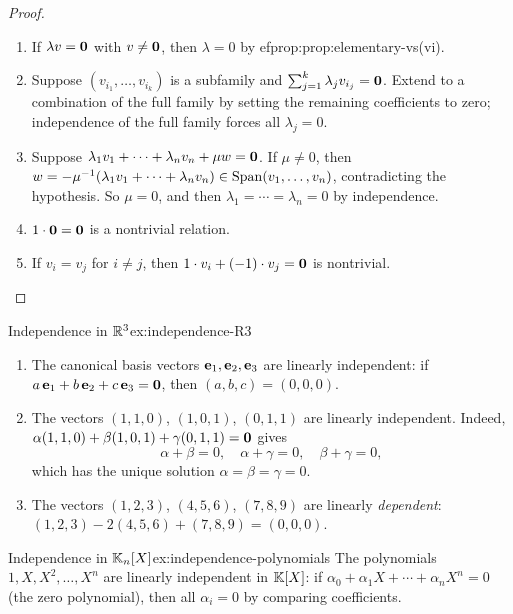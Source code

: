 \begin{proof}
\begin{enumerate}[label=(\roman*)]
  \item If $\lambda v = \mathbf{0}$ with $v\neq\mathbf{0}$, then $\lambda = 0$
    by 
ef{prop:prop:elementary-vs}(vi).

  \item Suppose $(v_{i_1},\ldots,v_{i_k})$ is a subfamily and
    $\sum_{j=1}^k \lambda_j v_{i_j} = \mathbf{0}$. Extend to a combination
    of the full family by setting the remaining coefficients to zero;
    independence of the full family forces all $\lambda_j = 0$.

  \item Suppose $\lambda_1 v_1+\cdots+\lambda_n v_n + \mu w = \mathbf{0}$.
    If $\mu\neq 0$, then
    $w = -\mu^{-1}(\lambda_1 v_1+\cdots+\lambda_n v_n)\in
    \operatorname{Span}(v_1,\ldots,v_n)$, contradicting the hypothesis. So $\mu=0$,
    and then $\lambda_1=\cdots=\lambda_n=0$ by independence.

  \item $1\cdot\mathbf{0} = \mathbf{0}$ is a nontrivial relation.

  \item If $v_i = v_j$ for $i\neq j$, then
    $1\cdot v_i + (-1)\cdot v_j = \mathbf{0}$ is nontrivial. \qedhere
\end{enumerate}
\end{proof}

\begin{example}{Independence in ${\mathbb{R}}^3$}{ex:independence-R3}
\begin{enumerate}[label=(\alph*)]
  \item The canonical basis vectors $\mathbf{e}_{1}, \mathbf{e}_{2}, \mathbf{e}_{3}$ are
    linearly independent: if $a\,\mathbf{e}_{1}+b\,\mathbf{e}_{2}+c\,\mathbf{e}_{3}=\mathbf{0}$,
    then $(a,b,c)=(0,0,0)$.
  \item The vectors $(1,1,0)$, $(1,0,1)$, $(0,1,1)$ are linearly
    independent. Indeed,
    $\alpha(1,1,0)+\beta(1,0,1)+\gamma(0,1,1)=\mathbf{0}$ gives
    \[
      \alpha+\beta=0,\quad \alpha+\gamma=0,\quad \beta+\gamma=0,
    \]
    which has the unique solution $\alpha=\beta=\gamma=0$.
  \item The vectors $(1,2,3)$, $(4,5,6)$, $(7,8,9)$ are linearly
    \emph{dependent}: $(1,2,3) - 2(4,5,6) + (7,8,9) = (0,0,0)$.
\end{enumerate}
\end{example}

\begin{example}{Independence in ${\mathbb{K}}_n[X]$}{ex:independence-polynomials}
The polynomials $1,X,X^2,\ldots,X^n$ are linearly independent in
${\mathbb{K}}[X]$: if $\alpha_0 + \alpha_1 X + \cdots + \alpha_n X^n = 0$ (the
zero polynomial), then all $\alpha_i = 0$ by comparing coefficients.
\end{example}


